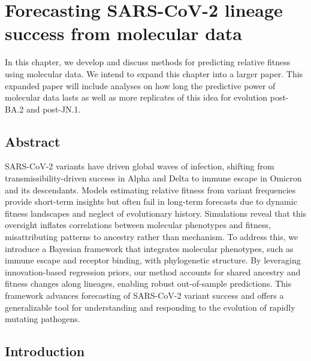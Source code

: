 \graphicspath{{./chapters/ncov-escape/}}
\chapter{Forecasting SARS-CoV-2 lineage success from molecular data}

In this chapter, we develop and discuss methods for predicting relative fitness using molecular data.
We intend to expand this chapter into a larger paper.
This expanded paper will include analyses on how long the predictive power of molecular data lasts as well as more replicates of this idea for evolution post-BA.2 and post-JN.1.

\section{Abstract}

%
SARS-CoV-2 variants have driven global waves of infection, shifting from transmissibility-driven success in Alpha and Delta to immune escape in Omicron and its descendants.
Models estimating relative fitness from variant frequencies provide short-term insights but often fail in long-term forecasts due to dynamic fitness landscapes and neglect of evolutionary history.
Simulations reveal that this oversight inflates correlations between molecular phenotypes and fitness, misattributing patterns to ancestry rather than mechanism.
To address this, we introduce a Bayesian framework that integrates molecular phenotypes, such as immune escape and receptor binding, with phylogenetic structure.
By leveraging innovation-based regression priors, our method accounts for shared ancestry and fitness changes along lineages, enabling robust out-of-sample predictions.
This framework advances forecasting of SARS-CoV-2 variant success and offers a generalizable tool for understanding and responding to the evolution of rapidly mutating pathogens.

\section{Introduction}

